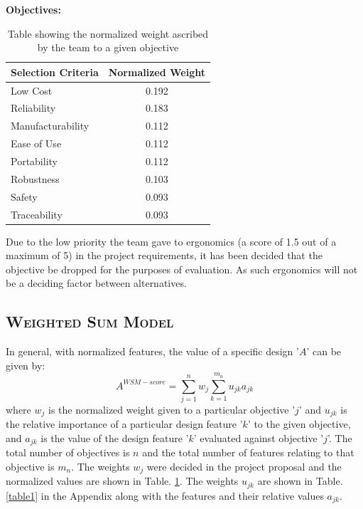 \documentclass[12pt]{article}
\begin{document}
\textbf{Objectives:}
\begin{table}[h!]   
\begin{center}
    \begin{tabular}{ | l | c |}
    \hline
    Selection Criteria & Normalized Weight  \\ \hline
    Low Cost & 0.192    \\ \hline
    Reliability & 0.183    \\ \hline
    Manufacturability & 0.112    \\ \hline
    Ease of Use & 0.112    \\ \hline
    Portability & 0.112    \\ \hline
    Robustness & 0.103    \\ \hline
    Safety & 0.093    \\ \hline
    Traceability & 0.093    \\ \hline
	\end{tabular}
\caption{Table showing the normalized weight ascribed by the team to a given objective}
\label{norm}    
\end{center}
\end{table}

Due to the low priority the team gave to ergonomics (a score of 1.5 out of a maximum of 5) in the project requirements, it has been decided that the objective be dropped for the purposes of evaluation. As such ergonomics will not be a deciding factor between alternatives.


\subsection{\textsc{Weighted Sum Model}}
In general, with normalized features, the value of a specific design '$A$' can be given by: $$A^{WSM-score} = \sum_{j=1}^n {w_j \sum^{m_n}_{k=1} {u_{jk} a_{jk}}}$$ where $w_j$ is the normalized weight given to a particular objective '$j$' and $u_{jk}$ is the relative importance of a particular design feature '$k$' to the given objective, and $a_{jk}$ is the value of the design feature '$k$' evaluated against objective '$j$'. The total number of objectives is $n$ and the total number of features relating to that objective is $m_n$. The weights $w_j$ were decided in the project proposal and the normalized values are shown in Table. \ref{norm}. The weights $u_{jk}$ are shown in Table. \ref{table1} in the Appendix along with the features and their relative values $a_{jk}$.
\end{document}
